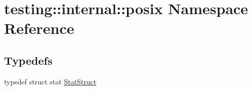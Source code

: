 \hypertarget{namespacetesting_1_1internal_1_1posix}{}\section{testing\+:\+:internal\+:\+:posix Namespace Reference}
\label{namespacetesting_1_1internal_1_1posix}
\subsection*{Typedefs}
\begin{DoxyCompactItemize}
\item 
typedef struct stat \hyperlink{namespacetesting_1_1internal_1_1posix_a8eb9f08d3af29941c2d2a964cfff3ecb}{Stat\+Struct}
\end{DoxyCompactItemize}
